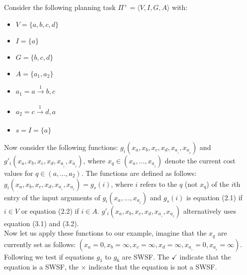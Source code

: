 Consider the following planning task $\Pi^+ = \langle V, I, G, A \rangle$ with:

\begin{center}
\begin{multicols}{2}
\begin{itemize}
\setlength\itemsep{0em}
\item $V = \{a,b,c,d\}$
\item $I = \{a\}$
\item $G = \{b,c,d\}$ 
\item $A = \{a_1,a_2\}$
\item $a_1 = a \xrightarrow[\text{}]{\text{1}} b,c$
\item $a_2 = c \xrightarrow[\text{}]{\text{1}} d,a$
\item $s = I = \{a\}$
\end{itemize}
\end{multicols}
\end{center}

Now consider the following functions: $g_i(x_a,x_b,x_c,x_d,x_a_{_1},x_a_{_2})$ and $g'_i(x_a,x_b,x_c,x_d,x_a_{_1},x_a_{_2})$, where $x_q \in (x_a,...,x_a_{_2})$ denote the current cost values for $q \in (a,...,a_2)$. The functions are defined as follows:\\

$g_i(x_a,x_b,x_c,x_d,x_a_{_1},x_a_{_2}) = g_s(i)$, where $i$ refers to the $q$ (not $x_q$) of the $i$th entry of the input arguments of $g_i(x_a,...,x_a_{_2})$ and $g_s(i)$ is equation (2.1) if $i \in V$ or equation (2.2) if $i \in A$. $g'_i(x_a,x_b,x_c,x_d,x_a_{_1},x_a_{_2})$ alternatively uses equation (3.1) and (3.2).\\

\newpage
Now let us apply these functions to our example, imagine that the $x_q$ are currently set as follows: $(x_a=0,x_b=\infty,x_c=\infty,x_d=\infty,x_a_{_1}=0,x_a_{_2}=\infty)$. Following we test if equations $g_1$ to $g_6$ are SWSF. The $\checkmark$ indicate that the equation is a SWSF, the $\times$ indicate that the equation is not a SWSF.\\


